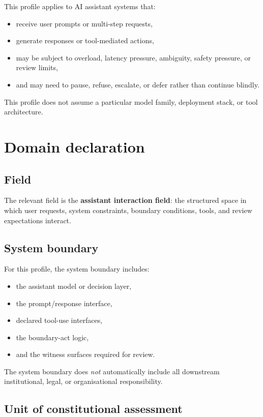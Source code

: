 \documentclass[11pt]{article}
\begin{document}
This profile applies to AI assistant systems that:
\begin{itemize}[leftmargin=2em]
    \item receive user prompts or multi-step requests,
    \item generate responses or tool-mediated actions,
    \item may be subject to overload, latency pressure, ambiguity, safety pressure, or review limits,
    \item and may need to pause, refuse, escalate, or defer rather than continue blindly.
\end{itemize}

This profile does not assume a particular model family, deployment stack, or tool architecture.

\section{Domain declaration}

\subsection{Field}

The relevant field is the \textbf{assistant interaction field}: the structured space in which user requests, system constraints, boundary conditions, tools, and review expectations interact.

\subsection{System boundary}

For this profile, the system boundary includes:
\begin{itemize}[leftmargin=2em]
    \item the assistant model or decision layer,
    \item the prompt/response interface,
    \item declared tool-use interfaces,
    \item the boundary-act logic,
    \item and the witness surfaces required for review.
\end{itemize}

The system boundary does \emph{not} automatically include all downstream institutional, legal, or organisational responsibility.

\subsection{Unit of constitutional assessment}
\end{document}
